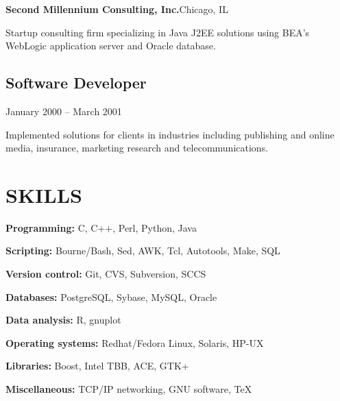 {\vskip 20pt

{\bf Second Millennium Consulting, Inc.}\quad Chicago, IL

Startup consulting firm specializing in Java J2EE solutions using BEA's
WebLogic application server and Oracle database.

\vskip 5pt
\subsection{Software Developer}
    {January 2000 -- March 2001}

Implemented solutions for clients in industries including publishing and
online media, insurance, marketing research and telecommunications.

}

\section{SKILLS}{%
{\bf Programming:} C, C++, Perl, Python, Java

{\bf Scripting:} Bourne/Bash, Sed, AWK, Tcl, Autotools, Make, SQL

{\bf Version control:} Git, CVS, Subversion, SCCS

{\bf Databases:} PostgreSQL, Sybase, MySQL, Oracle

{\bf Data analysis:} R, gnuplot

{\bf Operating systems:} Redhat/Fedora Linux, Solaris, HP-UX

{\bf Libraries:} Boost, Intel TBB, ACE, GTK+

{\bf Miscellaneous:} TCP/IP networking, GNU software, \TeX
}

